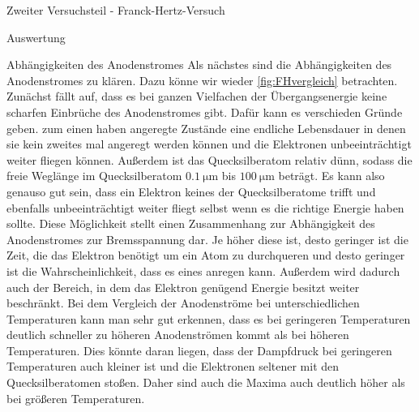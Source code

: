 \documentclass[pdftex, a4paper,11pt, twoside, ngerman]{report}
\begin{document}
\begin{chapter}{Zweiter Versuchsteil - Franck-Hertz-Versuch}
\begin{section}{Auswertung}
      \begin{subsection}{Abhängigkeiten des Anodenstromes}
        \label{chp:FH:sec:AuswertungAnodenstrom}
        Als nächstes sind die Abhängigkeiten des Anodenstromes zu klären. Dazu
        könne wir wieder \cref{fig:FHvergleich} betrachten. Zunächst fällt auf,
        dass es bei ganzen Vielfachen der Übergangsenergie keine scharfen
        Einbrüche des Anodenstromes gibt. Dafür kann es verschieden Gründe
        geben. \newline
        zum einen haben angeregte Zustände eine endliche Lebensdauer in denen
        sie kein zweites mal angeregt werden können und die Elektronen
        unbeeinträchtigt weiter fliegen können. Außerdem ist das
        Quecksilberatom relativ dünn, sodass die freie
        Weglänge im Quecksilberatom $\SI{0.1}{\micro\meter}$ bis
        $\SI{100}{\micro\meter}$ beträgt. Es kann also genauso gut sein, dass
        ein Elektron keines der Quecksilberatome trifft und ebenfalls
        unbeeinträchtigt weiter fliegt selbst wenn es die richtige Energie
        haben sollte. Diese Möglichkeit stellt einen Zusammenhang zur
        Abhängigkeit des Anodenstromes zur Bremsspannung dar. Je höher diese
        ist, desto geringer ist die Zeit, die das Elektron benötigt um
        ein Atom zu durchqueren und desto geringer ist die Wahrscheinlichkeit,
        dass es eines anregen kann. Außerdem wird dadurch auch der Bereich, in
        dem das Elektron genügend Energie besitzt weiter beschränkt. \newline
        Bei dem Vergleich der Anodenströme bei unterschiedlichen Temperaturen
        kann man sehr gut erkennen, dass es bei geringeren Temperaturen
        deutlich schneller zu höheren Anodenströmen kommt als bei höheren
        Temperaturen. Dies könnte daran liegen, dass der Dampfdruck bei
        geringeren Temperaturen auch kleiner ist und die Elektronen seltener
        mit den Quecksilberatomen stoßen. Daher sind auch die Maxima auch
        deutlich höher als bei größeren Temperaturen.
        
      \end{subsection}
      
      
      

\end{section}
\end{chapter}
\end{document}
